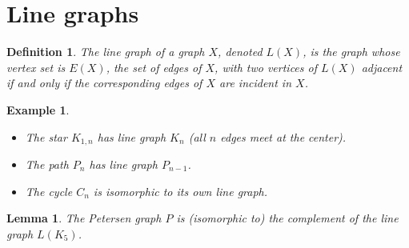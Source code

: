 \documentclass[12pt,a4paper,openany]{book}
\newtheorem{definition}{Definition}[section]
\newtheorem{example}{Example}[section]
\newtheorem{lemma}{Lemma}[section]
\begin{document}
\section{Line graphs}

\begin{definition}
The \emph{line graph} of a graph \(X\), denoted \(L(X)\), is the graph whose
vertex set is \(E(X)\), the set of edges of \(X\), with two vertices of
\(L(X)\) adjacent if and only if the corresponding edges of \(X\) are
incident in \(X\).
\end{definition}

\begin{example}
\leavevmode
\begin{itemize}
  \item The star \(K_{1,n}\) has line graph \(K_n\) (all \(n\) edges meet at the center).
  \item The path \(P_n\) has line graph \(P_{n-1}\).
  \item The cycle \(C_n\) is isomorphic to its own line graph.
\end{itemize}
\end{example}

\begin{lemma}
The Petersen graph $P$ is (isomorphic to) the complement of the line graph $L(K_5)$.
\end{lemma}
\end{document}
